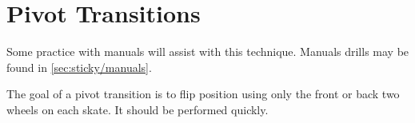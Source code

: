 \section{Pivot Transitions}
\label{sec:transitions/pivot}

Some practice with manuals will assist with this technique.
Manuals drills may be found in \ref{sec:sticky/manuals}.


The goal of a pivot transition is to flip position using only the front or back two wheels on each skate.  
It should be performed quickly.


